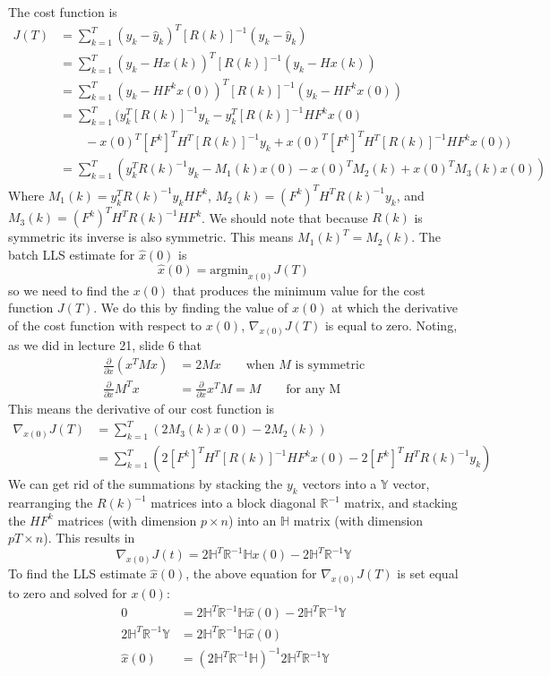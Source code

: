 \documentclass[11pt]{article}
\begin{document}
\subparagraph*{}
The cost function is
\begin{align*}
	J(T) &= \sum_{k=1}^T(y_k-\hat{y}_k)^T[R(k)]^{-1}(y_k-\hat{y}_k) \\
	&= \sum_{k=1}^T(y_k-Hx(k))^T[R(k)]^{-1}(y_k-Hx(k)) \\
	&= \sum_{k=1}^T(y_k-HF^kx(0))^T[R(k)]^{-1}(y_k-HF^kx(0)) \\
	&= \sum_{k=1}^T \Big(y_k^T[R(k)]^{-1}y_k - y_k^T[R(k)]^{-1}HF^kx(0) \\
	&\qquad-x(0)^T[F^k]^TH^T[R(k)]^{-1}y_k + x(0)^T[F^k]^TH^T[R(k)]^{-1}HF^kx(0) \Big) \\
	&= \sum_{k=1}^T (y_k^TR(k)^{-1}y_k - M_1(k)x(0) - x(0)^TM_2(k)+x(0)^TM_3(k)x(0))
\end{align*}
Where $M_1(k) = y_k^TR(k)^{-1}y_kHF^k$, $M_2(k) = (F^k)^TH^TR(k)^{-1}y_k$, and $M_3(k)=(F^k)^TH^TR(k)^{-1}HF^k$. We should note that because $R(k)$ is symmetric its inverse is also symmetric. This means $M_1(k)^T=M_2(k)$. The batch LLS estimate for $\hat{x}(0)$ is
\begin{equation*}
	\hat{x}(0) = \text{argmin}_{x(0)}J(T)
\end{equation*}
so we need to find the $x(0)$ that produces the minimum value for the cost function $J(T)$. We do this by finding the value of $x(0)$ at which the derivative of the cost function with respect to $x(0)$, $\nabla_{x(0)}J(T)$ is equal to zero. Noting, as we did in lecture 21, slide 6 that 
\begin{align*}
	\frac{\partial}{\partial x}(x^TMx) &= 2Mx \qquad \text{when $M$ is symmetric}\\ 
	\frac{\partial}{\partial x}M^Tx &= \frac{\partial}{\partial x}x^TM = M \qquad \text{for any M}
\end{align*}
This means the derivative of our cost function is
\begin{align*}
	\nabla_{x(0)}J(T) &= \sum_{k=1}^T (2M_3(k)x(0)-2M_2(k)) \\
	&= \sum_{k=1}^T (2[F^k]^TH^T[R(k)]^{-1}HF^kx(0)-2[F^k]^TH^TR(k)^{-1}y_k)
\end{align*}
We can get rid of the summations by stacking the $y_k$ vectors into a $\mathbb{Y}$ vector, rearranging the $R(k)^{-1}$ matrices into a block diagonal $\mathbb{R}^{-1}$ matrix, and stacking the $HF^k$ matrices (with dimension $p\times n$) into an $\mathbb{H}$ matrix (with dimension $pT\times n$). This results in 
\begin{equation*}
	\nabla_{x(0)}J(t) = 2\mathbb{H}^T\mathbb{R}^{-1}\mathbb{H}x(0) - 2\mathbb{H}^T\mathbb{R}^{-1}\mathbb{Y}
\end{equation*}
To find the LLS estimate $\hat{x}(0)$, the above equation for $\nabla_{x(0)}J(T)$ is set equal to zero and solved for $x(0)$:
\begin{align*}
	0 &= 2\mathbb{H}^T\mathbb{R}^{-1}\mathbb{H}\hat{x}(0)-2\mathbb{H}^T\mathbb{R}^{-1}\mathbb{Y} \\
	2\mathbb{H}^T\mathbb{R}^{-1}\mathbb{Y} &= 2\mathbb{H}^T\mathbb{R}^{-1}\mathbb{H}\hat{x}(0) \\
	\hat{x}(0) &= (2\mathbb{H}^T\mathbb{R}^{-1}\mathbb{H})^{-1}2\mathbb{H}^T\mathbb{R}^{-1}\mathbb{Y}
\end{align*}
\end{document}
